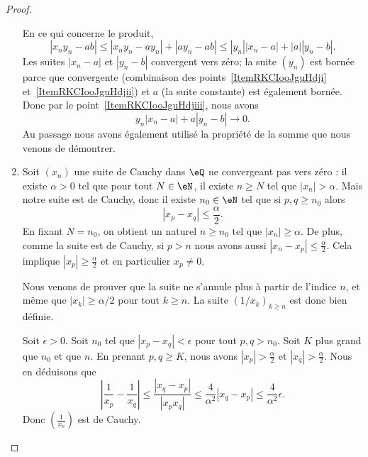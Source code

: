 \begin{proof}
\begin{enumerate}
            En ce qui concerne le produit,
            \begin{equation}
                | x_ny_n-ab |\leq | x_ny_n-ay_n |+| ay_n-ab |\leq | y_n || x_n-a |+| a || y_n-b |.
            \end{equation}
            Les suites \( | x_n-a |\) et \( | y_n-b |\) convergent vers zéro; la suite \( (y_n)\) est bornée parce que convergente (combinaison des points~\ref{ItemRKCIooJguHdji} et~\ref{ItemRKCIooJguHdjii})  et \( a\) (la suite constante) est également bornée. Donc par le point~\ref{ItemRKCIooJguHdjiii}, nous avons
            \begin{equation}
                y_n| x_n-a |+a| y_n-b |\to 0.
            \end{equation}
            Au passage nous avons également utilisé la propriété de la somme que nous venons de démontrer.
        \item Soit \( (x_n)\) une suite de Cauchy dans \( \eQ\) ne convergeant pas vers zéro : il existe \( \alpha>0\) tel que pour tout \( N\in \eN\), il existe \( n\geq N\) tel que \( | x_n |>\alpha\). Mais notre suite est de Cauchy, donc il existe \( n_0\in \eN\) tel que si \( p,q\geq n_0\) alors
            \begin{equation}
                | x_p-x_q |\leq \frac{ \alpha }{2}.
            \end{equation}
            En fixant \( N = n_0\), on obtient un naturel \( n\geq n_0\) tel que \( | x_n |\geq \alpha\). De plus, comme la suite est de Cauchy, si \( p>n\) nous avons aussi \( | x_n-x_p |\leq \frac{ \alpha }{2}\). Cela implique \( | x_p |\geq \frac{ \alpha }{2}\) et en particulier \( x_p\neq 0\).

            Nous venons de prouver que la suite ne s'annule plus à partir de l'indice \( n\), et même que \( | x_k |\geq\alpha/2\) pour tout \( k\geq n\). La suite \( (1/x_k)_{k\geq n}\) est donc bien définie.

            Soit \( \epsilon>0\). Soit \( n_0\) tel que \( | x_p-x_q |<\epsilon\) pour tout \( p,q>n_0\). Soit \( K\) plus grand que \( n_0\) et que \( n\). En prenant \( p,q\geq K\), nous avons \( |  x_p|>\frac{ \alpha }{2}\) et \( | x_q |>\frac{ \alpha }{2}\). Nous en déduisons que
            \begin{equation}
                \left| \frac{1}{ x_p }-\frac{1}{ x_q } \right| \leq \frac{ | x_q-x_p | }{ | x_px_q | }\leq \frac{ 4 }{ \alpha^2 }| x_q-x_p |\leq \frac{ 4 }{ \alpha^2 }\epsilon.
            \end{equation}
            Donc \( \left( \frac{1}{ x_n } \right)\) est de Cauchy.
    \end{enumerate}
\end{proof}

